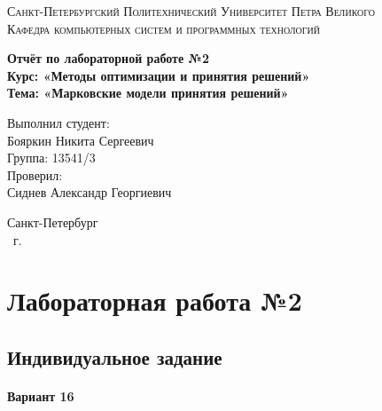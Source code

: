 \documentclass[14pt,a4paper,report]{report}
\begin{document}
\def\contentsname{Содержание}

\begin{titlepage}
	\begin{center}
		\textsc{Санкт-Петербургский Политехнический 
			Университет Петра Великого\\[5mm]
			Кафедра компьютерных систем и программных технологий}
		
		\vfill
		
		\textbf{Отчёт по лабораторной работе №2\\[3mm]
			Курс: «Методы оптимизации и принятия решений»\\[3mm]
			Тема: «Марковские модели принятия решений»\\[35mm]
			}
	\end{center}
	
	\hfill
	\begin{minipage}{.5\textwidth}
		Выполнил студент:\\[2mm] 
		Бояркин Никита Сергеевич\\
		Группа: 13541/3\\[5mm]
		
		Проверил:\\[2mm] 
		Сиднев Александр Георгиевич
	\end{minipage}
	\vfill
	\begin{center}
		Санкт-Петербург\\ \the\year\ г.
	\end{center}
\end{titlepage}

\tableofcontents
\clearpage

\chapter{Лабораторная работа №2}

\section{Индивидуальное задание}

\subsubsection{Вариант 16}
\end{document}
